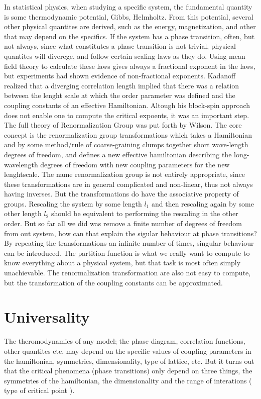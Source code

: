 In statistical physics, when studying a specific system, the fundamental quantity is some thermodynamic potential,  Gibbs, Helmholtz. From this potential, several other physical quantites are derived, such as the energy, magnetization, and other that may depend on the specifics. 
If the system has a phase transition, often, but not always, since what constitutes a phase transition is not trivial, physical quantites will diverege, and follow certain scaling laws as they do. 
Using mean field theory to calculate these laws gives always a fractional exponent in the laws, but experiments had shown evidence of non-fractional exponents. 
Kadanoff realized that a diverging correlation length implied that there was a relation between the lenght scale at which the order parameter was defined and the coupling constants of an effective Hamiltonian. Altough his block-spin approach does not enable one to compute the critical expoents, it was an important step.
The full theory of Renormalization Group was put forth by Wilson.
The core concept is the renormalization group transformations which takes a Hamiltonian and by some method/rule of coarse-graining clumps together short wave-length degrees of freedom, and defines a new effective hamiltonian describing the long-wavelength degrees of freedom with new coupling parameters for the new lenghtscale.
The name renormalization group is not entirely appropriate, since these transformations are in general complicated and non-linear, thus not always having inverses. But the transformations do have the associative property of groups. Rescaling the system by some length $l_1$ and then rescaling again by some other length $l_2$ should be equivalent to performing the rescaling in the other order.
But so far all we did was remove a finite number of degrees of freedom from out system, how can that explain the sigular behaviour at phase transitions? By repeating the transformations an infinite number of times, singular behaviour can be introduced.
The partition function is what we really want to compute to know everything about a physical system, but that task is most often simply unachievable. The renormalization transformation are also not easy to compute, but the transformation of the coupling constants can be approximated.

\section{Universality}
The theromodynamics of any model; the phase diagram, correlation functions, other quantites etc, may depend on the specific values of coupling parameters in the hamiltonian, symmetries, dimensionality, type of lattice, etc. 
But it turns out that the critical phenomena (phase transitions) only depend on three things, the symmetries of the hamiltonian, the dimensionality and the range of interations ( type of critical point ).

